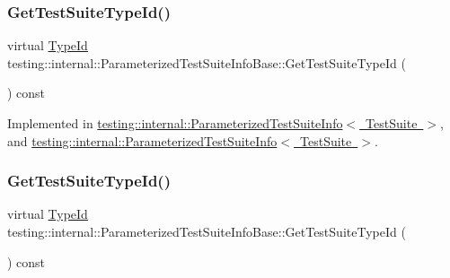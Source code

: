 \subsubsection{\texorpdfstring{GetTestSuiteTypeId()}{GetTestSuiteTypeId()}\hspace{0.1cm}{\footnotesize\ttfamily [1/2]}}
{\footnotesize\ttfamily virtual \mbox{\hyperlink{namespacetesting_1_1internal_a38c435cbab5f8b784e2e7f3356cab242}{Type\+Id}} testing\+::internal\+::\+Parameterized\+Test\+Suite\+Info\+Base\+::\+Get\+Test\+Suite\+Type\+Id (\begin{DoxyParamCaption}{ }\end{DoxyParamCaption}) const\hspace{0.3cm}{\ttfamily [pure virtual]}}



Implemented in \mbox{\hyperlink{classtesting_1_1internal_1_1_parameterized_test_suite_info_af488d1d7c1889a250acff2ea6eba4c84}{testing\+::internal\+::\+Parameterized\+Test\+Suite\+Info$<$ Test\+Suite $>$}}, and \mbox{\hyperlink{classtesting_1_1internal_1_1_parameterized_test_suite_info_af488d1d7c1889a250acff2ea6eba4c84}{testing\+::internal\+::\+Parameterized\+Test\+Suite\+Info$<$ Test\+Suite $>$}}.

\mbox{\label{classtesting_1_1internal_1_1_parameterized_test_suite_info_base_ac5bcbf8c50a44472d697e0c80b54387d}} 
\subsubsection{\texorpdfstring{GetTestSuiteTypeId()}{GetTestSuiteTypeId()}\hspace{0.1cm}{\footnotesize\ttfamily [2/2]}}
{\footnotesize\ttfamily virtual \mbox{\hyperlink{namespacetesting_1_1internal_a38c435cbab5f8b784e2e7f3356cab242}{Type\+Id}} testing\+::internal\+::\+Parameterized\+Test\+Suite\+Info\+Base\+::\+Get\+Test\+Suite\+Type\+Id (\begin{DoxyParamCaption}{ }\end{DoxyParamCaption}) const\hspace{0.3cm}{\ttfamily [pure virtual]}}



